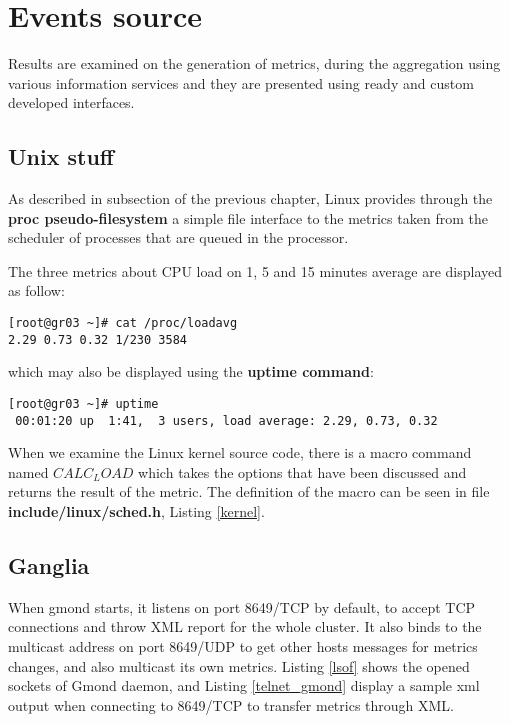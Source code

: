 
\section{Events source}

Results are examined on the generation of metrics, during the aggregation using various information services and they are presented using ready and custom developed interfaces.

\subsection{Unix stuff}

As described in subsection  of the previous chapter, Linux provides through the {\bf proc pseudo-filesystem} a simple file interface to the metrics taken from the scheduler of processes that are queued in the processor.

The three metrics about CPU load on 1, 5 and 15 minutes average are displayed as follow:

\begin{verbatim}
[root@gr03 ~]# cat /proc/loadavg 
2.29 0.73 0.32 1/230 3584
\end{verbatim}

which may also be displayed using the {\bf uptime command}:

\begin{lstlisting}
[root@gr03 ~]# uptime
 00:01:20 up  1:41,  3 users, load average: 2.29, 0.73, 0.32
\end{lstlisting}

When we examine the Linux kernel source code, there is a macro command named $CALC_LOAD$ which takes the options that have been discussed and returns the result of the metric. The definition of the macro can be seen in file {\bf include/linux/sched.h}, Listing \ref{kernel}.

\subsection{Ganglia}

When gmond starts, it listens on port 8649/TCP by default, to accept TCP connections and throw XML report for the whole cluster. It also binds to the multicast address on port 8649/UDP to get other hosts messages for metrics changes, and also multicast its own metrics. Listing \ref{lsof} shows the opened sockets of Gmond daemon, and Listing \ref{telnet_gmond} display a sample xml output when connecting to 8649/TCP to transfer metrics through XML.

